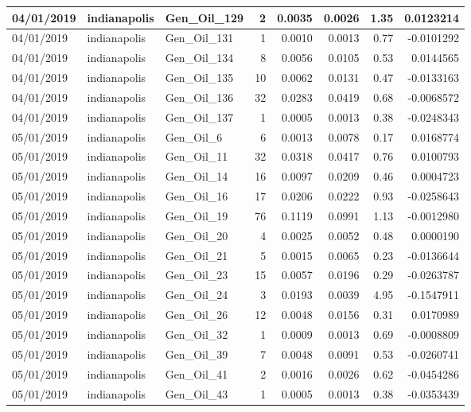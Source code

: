 \documentclass[
  letterpaper,
  DIV=11,
  numbers=noendperiod]{scrartcl}
\begin{document}
\begin{tabular}{l|l|l|r|r|r|r|r}
\hline
04/01/2019 & indianapolis & Gen\_Oil\_129 & 2 & 0.0035 & 0.0026 & 1.35 & 0.0123214\\
\hline
04/01/2019 & indianapolis & Gen\_Oil\_131 & 1 & 0.0010 & 0.0013 & 0.77 & -0.0101292\\
\hline
04/01/2019 & indianapolis & Gen\_Oil\_134 & 8 & 0.0056 & 0.0105 & 0.53 & 0.0144565\\
\hline
04/01/2019 & indianapolis & Gen\_Oil\_135 & 10 & 0.0062 & 0.0131 & 0.47 & -0.0133163\\
\hline
04/01/2019 & indianapolis & Gen\_Oil\_136 & 32 & 0.0283 & 0.0419 & 0.68 & -0.0068572\\
\hline
04/01/2019 & indianapolis & Gen\_Oil\_137 & 1 & 0.0005 & 0.0013 & 0.38 & -0.0248343\\
\hline
05/01/2019 & indianapolis & Gen\_Oil\_6 & 6 & 0.0013 & 0.0078 & 0.17 & 0.0168774\\
\hline
05/01/2019 & indianapolis & Gen\_Oil\_11 & 32 & 0.0318 & 0.0417 & 0.76 & 0.0100793\\
\hline
05/01/2019 & indianapolis & Gen\_Oil\_14 & 16 & 0.0097 & 0.0209 & 0.46 & 0.0004723\\
\hline
05/01/2019 & indianapolis & Gen\_Oil\_16 & 17 & 0.0206 & 0.0222 & 0.93 & -0.0258643\\
\hline
05/01/2019 & indianapolis & Gen\_Oil\_19 & 76 & 0.1119 & 0.0991 & 1.13 & -0.0012980\\
\hline
05/01/2019 & indianapolis & Gen\_Oil\_20 & 4 & 0.0025 & 0.0052 & 0.48 & 0.0000190\\
\hline
05/01/2019 & indianapolis & Gen\_Oil\_21 & 5 & 0.0015 & 0.0065 & 0.23 & -0.0136644\\
\hline
05/01/2019 & indianapolis & Gen\_Oil\_23 & 15 & 0.0057 & 0.0196 & 0.29 & -0.0263787\\
\hline
05/01/2019 & indianapolis & Gen\_Oil\_24 & 3 & 0.0193 & 0.0039 & 4.95 & -0.1547911\\
\hline
05/01/2019 & indianapolis & Gen\_Oil\_26 & 12 & 0.0048 & 0.0156 & 0.31 & 0.0170989\\
\hline
05/01/2019 & indianapolis & Gen\_Oil\_32 & 1 & 0.0009 & 0.0013 & 0.69 & -0.0008809\\
\hline
05/01/2019 & indianapolis & Gen\_Oil\_39 & 7 & 0.0048 & 0.0091 & 0.53 & -0.0260741\\
\hline
05/01/2019 & indianapolis & Gen\_Oil\_41 & 2 & 0.0016 & 0.0026 & 0.62 & -0.0454286\\
\hline
05/01/2019 & indianapolis & Gen\_Oil\_43 & 1 & 0.0005 & 0.0013 & 0.38 & -0.0353439\\

\end{tabular}
\end{document}
